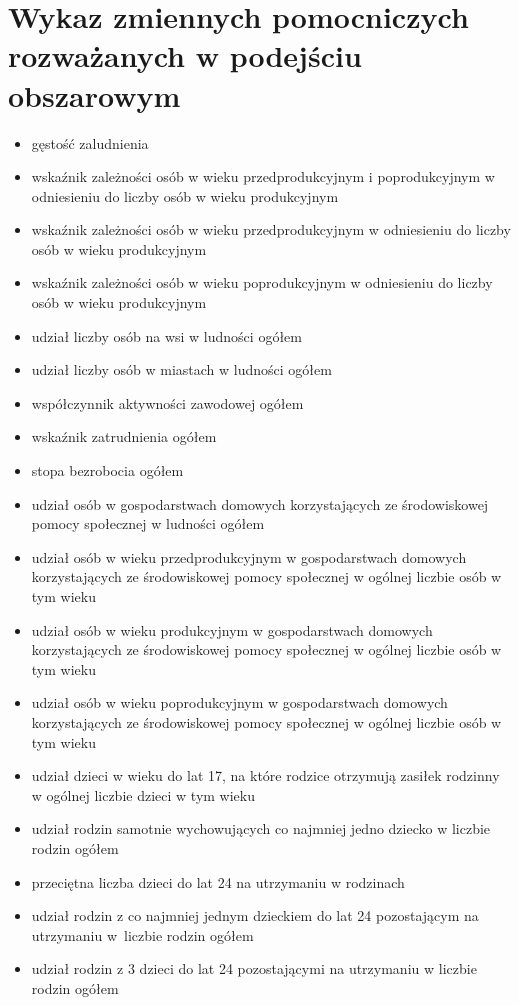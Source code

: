\section{Wykaz zmiennych pomocniczych rozważanych w podejściu obszarowym}

\begin{itemize}
\item gęstość zaludnienia
\item wskaźnik zależności osób w wieku przedprodukcyjnym i poprodukcyjnym w odniesieniu do liczby osób w wieku produkcyjnym
\item wskaźnik zależności osób w wieku przedprodukcyjnym w odniesieniu do liczby osób w wieku produkcyjnym
\item wskaźnik zależności osób w wieku poprodukcyjnym w odniesieniu do liczby osób w wieku produkcyjnym
\item udział liczby osób na wsi w ludności ogółem
\item udział liczby osób w miastach w ludności ogółem
\item współczynnik aktywności zawodowej ogółem
\item wskaźnik zatrudnienia ogółem
\item stopa bezrobocia ogółem
\item udział osób w gospodarstwach domowych korzystających ze środowiskowej pomocy społecznej w ludności ogółem
\item udział osób w wieku przedprodukcyjnym w gospodarstwach domowych korzystających ze środowiskowej pomocy społecznej w ogólnej liczbie osób w tym wieku
\item udział osób w wieku produkcyjnym w gospodarstwach domowych korzystających ze środowiskowej pomocy społecznej w ogólnej liczbie osób w tym wieku
\item udział osób w wieku poprodukcyjnym w gospodarstwach domowych korzystających ze środowiskowej pomocy społecznej w ogólnej liczbie osób w tym wieku
\item udział dzieci w wieku do lat 17, na które rodzice otrzymują zasiłek rodzinny w ogólnej liczbie dzieci w tym wieku
\item udział rodzin samotnie wychowujących co najmniej jedno dziecko w liczbie rodzin ogółem
\item przeciętna liczba dzieci do lat 24 na utrzymaniu w rodzinach
\item udział rodzin z co najmniej jednym dzieckiem do lat 24 pozostającym na utrzymaniu w~liczbie rodzin ogółem
\item udział rodzin z 3 dzieci do lat 24 pozostającymi na utrzymaniu w liczbie rodzin ogółem

\end{itemize}
